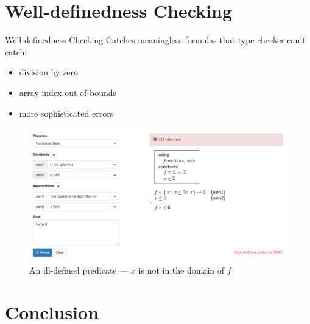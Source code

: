 \documentclass[11pt]{beamer}
\begin{document}
\section{Well-definedness Checking}

\begin{frame}[fragile]{Well-definedness Checking}
  Catches meaningless formulas that type checker can't catch:
  \begin{itemize}
  \item <2-> division by zero
  \item <3-> array index out of bounds
  \item <4-> more sophisticated errors
  \end{itemize}
\end{frame}

\begin{frame}[plain]
  \begin{figure}
    \centering
    \includegraphics[width=\textwidth]{img/unitb_wd.png}
    \caption{An ill-defined predicate --- $x$ is not in
                  the domain of $f$}\label{fig:wd}
  \end{figure}
\end{frame}


    


\section{Conclusion}
\end{document}
